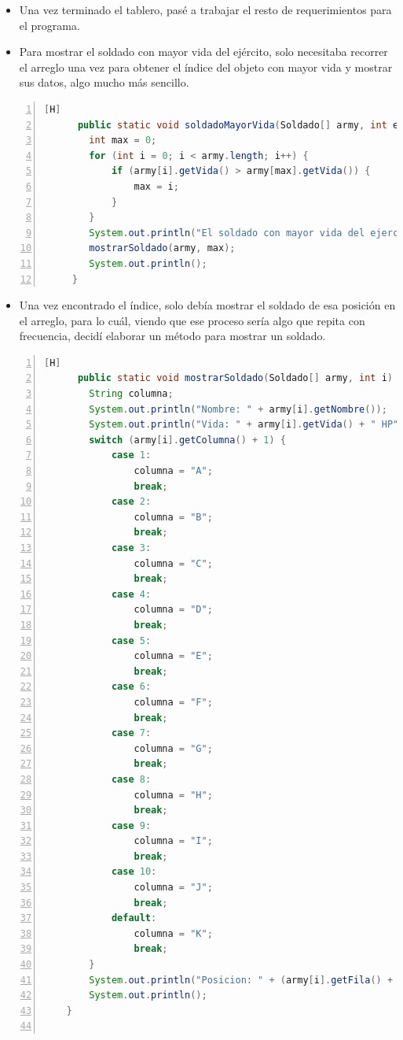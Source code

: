 \documentclass{article}
\begin{document}
	\begin{itemize}	
		\item Una vez terminado el tablero, pasé a trabajar el resto de requerimientos para el programa.
		\item Para mostrar el soldado con mayor vida del ejército, solo necesitaba recorrer el arreglo una vez para obtener el índice del objeto con mayor vida y mostrar sus datos, algo mucho más sencillo.
	\end{itemize}
	\begin{lstlisting}[language=java,caption={Soldado con mayor vida}, numbers=left][H]
	  public static void soldadoMayorVida(Soldado[] army, int ej) {
        int max = 0;
        for (int i = 0; i < army.length; i++) {
            if (army[i].getVida() > army[max].getVida()) {
                max = i;
            }
        }
        System.out.println("El soldado con mayor vida del ejercito " + ej + " es: ");
        mostrarSoldado(army, max);
        System.out.println();
     }
	\end{lstlisting}
	\begin{itemize}	
		\item Una vez encontrado el índice, solo debía mostrar el soldado de esa posición en el arreglo, para lo cuál, viendo que ese proceso sería algo que repita con frecuencia, decidí elaborar un método para mostrar un soldado.
	\end{itemize}
	\begin{lstlisting}[language=java,caption={Mostrar soldado}, numbers=left][H]
	  public static void mostrarSoldado(Soldado[] army, int i) {
        String columna;
        System.out.println("Nombre: " + army[i].getNombre());
        System.out.println("Vida: " + army[i].getVida() + " HP");
        switch (army[i].getColumna() + 1) {
            case 1:
                columna = "A";
                break;
            case 2:
                columna = "B";
                break;
            case 3:
                columna = "C";
                break;
            case 4:
                columna = "D";
                break;
            case 5:
                columna = "E";
                break;
            case 6:
                columna = "F";
                break;
            case 7:
                columna = "G";
                break;
            case 8:
                columna = "H";
                break;
            case 9:
                columna = "I";
                break;
            case 10:
                columna = "J";
                break;
            default:
                columna = "K";
                break;
        }
        System.out.println("Posicion: " + (army[i].getFila() + 1) + "-" + columna);
        System.out.println();
    }
    
	\end{lstlisting}
	
\end{document}
